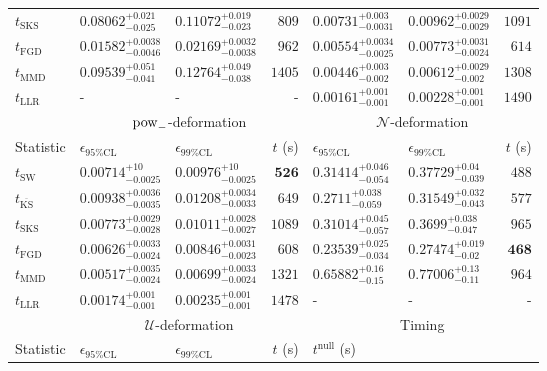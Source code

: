 \begin{tabular}{l|llr|llr}
	$t_{\mathrm{SKS}}$ & $0.08062_{-0.025}^{+0.021}$ & $0.11072_{-0.023}^{+0.019}$ & $809$ & $0.00731_{-0.0031}^{+0.003}$ & $0.00962_{-0.0029}^{+0.0029}$ & $1091$ \\
	$t_{\mathrm{FGD}}$ & ${\mathbf{0.01582_{-0.0046}^{+0.0038}}}$ & ${\mathbf{0.02169_{-0.0038}^{+0.0032}}}$ & $962$ & $0.00554_{-0.0025}^{+0.0034}$ & $0.00773_{-0.0024}^{+0.0031}$ & $614$ \\
	$t_{\mathrm{MMD}}$ & $0.09539_{-0.041}^{+0.051}$ & $0.12764_{-0.038}^{+0.049}$ & $1405$ & ${\mathbf{0.00446_{-0.002}^{+0.003}}}$ & ${\mathbf{0.00612_{-0.002}^{+0.0029}}}$ & $1308$ \\
	$t_{\mathrm{LLR}}$ & - & - & - & $0.00161_{-0.001}^{+0.001}$ & $0.00228_{-0.001}^{+0.001}$ & $1490$ \\
	\toprule
	\multicolumn{1}{c}{} & \multicolumn{3}{c}{$\rm{pow}_{-}$-deformation} & \multicolumn{3}{c}{$\mathcal{N}$-deformation} \\
	Statistic & $\epsilon_{95\%\mathrm{CL}}$ & $\epsilon_{99\%\mathrm{CL}}$ & $t$ (s) & $\epsilon_{95\%\mathrm{CL}}$ & $\epsilon_{99\%\mathrm{CL}}$ & $t$ (s) \\
	\midrule
	$t_{\mathrm{SW}}$ & $0.00714_{-0.0025}^{+10}$ & $0.00976_{-0.0025}^{+10}$ & ${\mathbf{526}}$ & $0.31414_{-0.054}^{+0.046}$ & $0.37729_{-0.039}^{+0.04}$ & $488$ \\
	$t_{\overline{\mathrm{KS}}}$ & $0.00938_{-0.0035}^{+0.0036}$ & $0.01208_{-0.0033}^{+0.0034}$ & $649$ & $0.2711_{-0.059}^{+0.038}$ & $0.31549_{-0.043}^{+0.032}$ & $577$ \\
	$t_{\mathrm{SKS}}$ & $0.00773_{-0.0028}^{+0.0029}$ & $0.01011_{-0.0027}^{+0.0028}$ & $1089$ & $0.31014_{-0.057}^{+0.045}$ & $0.3699_{-0.047}^{+0.038}$ & $965$ \\
	$t_{\mathrm{FGD}}$ & $0.00626_{-0.0024}^{+0.0033}$ & $0.00846_{-0.0023}^{+0.0031}$ & $608$ & ${\mathbf{0.23539_{-0.034}^{+0.025}}}$ & ${\mathbf{0.27474_{-0.02}^{+0.019}}}$ & ${\mathbf{468}}$ \\
	$t_{\mathrm{MMD}}$ & ${\mathbf{0.00517_{-0.0024}^{+0.0035}}}$ & ${\mathbf{0.00699_{-0.0024}^{+0.0033}}}$ & $1321$ & $0.65882_{-0.15}^{+0.16}$ & $0.77006_{-0.11}^{+0.13}$ & $964$ \\
	$t_{\mathrm{LLR}}$ & $0.00174_{-0.001}^{+0.001}$ & $0.00235_{-0.001}^{+0.001}$ & $1478$ & - & - & - \\
	\toprule
	\multicolumn{1}{c}{} & \multicolumn{3}{c}{$\mathcal{U}$-deformation} & \multicolumn{3}{c}{Timing} \\
	Statistic & $\epsilon_{95\%\mathrm{CL}}$ & $\epsilon_{99\%\mathrm{CL}}$ & $t$ (s) & $t^{\mathrm{null}}$ (s) \\

\end{tabular}
